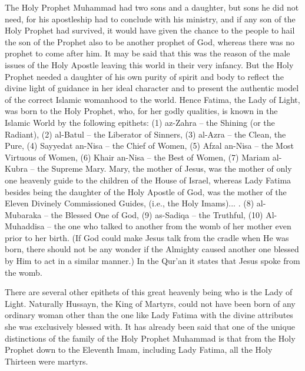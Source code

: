 \begin{quotationx}
The Holy Prophet Muhammad had two sons and a daughter, but sons he did not need, for his apostleship had to conclude with his ministry, and if any son of the Holy Prophet had survived, it would have given the chance to the people to hail the son of the Prophet also to be another prophet of God, whereas there was no prophet to come after him. It may be said that this was the reason of the male issues of the Holy Apostle leaving this world in their very infancy. But the Holy Prophet needed a daughter of his own purity of spirit and body to reflect the divine light of guidance in her ideal character and to present the authentic model of the correct Islamic womanhood to the world. Hence Fatima, the Lady of Light, was born to the Holy Prophet, who, for her godly qualities, is known in the Islamic World by the following epithets: (1) az-Zahra -- the Shining (or the Radiant), (2) al-Batul -- the Liberator of Sinners, (3) al-Azra -- the Clean, the Pure, (4) Sayyedat an-Nisa -- the Chief of Women, (5) Afzal an-Nisa -- the Most Virtuous of Women, (6) Khair an-Nisa -- the Best of Women, (7) Mariam al-Kubra -- the Supreme Mary. Mary, the mother of Jesus, was the mother of only one heavenly guide to the children of the House of Israel, whereas Lady Fatima besides being the daughter of the Holy Apostle of God, was the mother of the Eleven Divinely Commissioned Guides, (i.e., the Holy Imams)... . (8) al-Mubaraka -- the Blessed One of God, (9) as-Sadiqa -- the Truthful, (10) Al-Muhaddisa -- the one who talked to another from the womb of her mother even prior to her birth. (If God could make Jesus talk from the cradle when He was born, there should not be any wonder if the Almighty caused another one blessed by Him to act in a similar manner.) In the Qur'an it states that Jesus spoke from the womb.

There are several other epithets of this great heavenly being who is the Lady of Light. Naturally Hussayn, the King of Martyrs, could not have been born of any ordinary woman other than the one like Lady Fatima with the divine attributes she was exclusively blessed with. It has already been said that one of the unique distinctions of the family of the Holy Prophet Muhammad is that from the Holy Prophet down to the Eleventh Imam, including Lady Fatima, all the Holy Thirteen were martyrs.
\end{quotationx}

